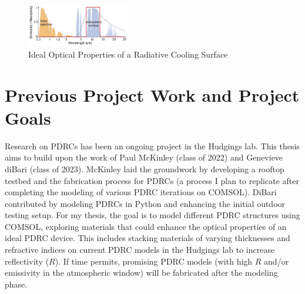 \begin{figure}
  \centering
  \includegraphics[width=0.4\textwidth]{Chapters/Figures/Ideal Optical Properties of a Radiative Cooling Surface.jpg}
  \caption{Ideal Optical Properties of a Radiative Cooling Surface}
\end{figure}

\section{Previous Project Work and Project Goals}
Research on PDRCs has been an ongoing project in the Hudgings lab. This thesis aims to build upon the work of Paul McKinley (class of 2022) and Genevieve diBari (class of 2023). McKinley laid the groundwork by developing a rooftop testbed and the fabrication process for PDRCs (a process I plan to replicate after completing the modeling of various PDRC iterations on COMSOL). DiBari contributed by modeling PDRCs in Python and enhancing the initial outdoor testing setup. For my thesis, the goal is to model different PDRC structures using COMSOL, exploring materials that could enhance the optical properties of an ideal PDRC device. This includes stacking materials of varying thicknesses and refractive indices on current PDRC models in the Hudgings lab to increase reflectivity ($R$). If time permits, promising PDRC models (with high $R$ and/or emissivity in the atmospheric window) will be fabricated after the modeling phase. %
